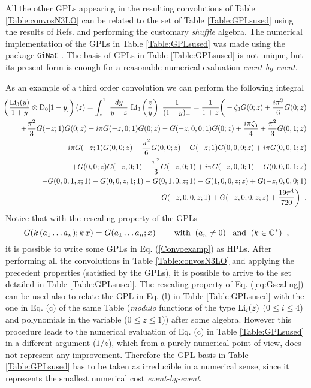 \documentclass[12pt]{article}
\def\beq{\begin{equation}}
\def\eeq{\end{equation}}
\def\beeq{\begin{eqnarray}}
\def\eeeq{\end{eqnarray}}
\def\nn{\nonumber}
\newcommand\f[2]{\frac{#1}{#2}}
\begin{document}
All the other GPLs appearing in the resulting convolutions of Table \ref{Table:convosN3LO} can be related to the set of Table \ref{Table:GPLsused} using the results of Refs. \cite{Frellesvig:2016ske,Maitre:2005uu,Duhr:2011zq} and performing the customary \textit{shuffle} algebra. The numerical implementation of the GPLs in Table \ref{Table:GPLsused} was made using the package \texttt{GiNaC} \cite{Bauer:2000cp}. The basis of GPLs in Table \ref{Table:GPLsused} is not unique, but its present form is enough for a reasonable numerical evaluation \textit{event-by-event}.  

As an example of a third order convolution we can perform the following integral
\beeq\label{Convoexamp}
   &&\!\!\!\!\!\!\!\!\left(\f{{\rm Li}_{3}( y) }{1+y}\otimes  {\rm D}_{0}[1-y]\right)(z) = \int^{1}_{z}~\f{dy}{y+z}~{\rm Li}_{3}\left(\f{z}{y}\right)~\f{1}{(1-y)_{+}}  =\f{1}{1+z}\bigg(-  \zeta_{3} G(0;z)+\frac{i \pi ^3 }{6 }G(0;z)\nn\\
   &&\!\!\!\!\!\!\!\!\!\!+\f{\pi ^2}{3}G(-z;1) G(0;z)-i \pi  G(-z,0;1)G(0;z)-G(-z,0,0;1) G(0;z)+\frac{i\pi  \zeta_{3}}{4}+\frac{\pi ^2 }{3 }G(0,1;z)\nn\\
   &&\!\!\!\!\!\!\!\!\!\! +i \pi  G(-z;1) G(0,0;z)-\frac{\pi ^2 }{6 }G(0,0;z)-G(-z;1) G(0,0,0;z)+i \pi G(0,0,1;z)\nn\\
   &&\!\!\!\!\!\!\!\!\!\! +G(0,0;z)G(-z,0;1)-\frac{\pi ^2 }{3}G(-z,0;1)+i \pi G(-z,0,0;1)-G(0,0,0,1;z)\nn\\
   &&\!\!\!\!\!\!\!\!\!\!-G(0,0,1,z;1)-G(0,0,z,1;1)-G(0,1,0,z;1)-G(1,0,0,z;z)+G(-z,0,0,0;1)\nn\\
   &&\!\!\!\!\!\!\!\!\!\!-G(-z,0,0,z;1)+G(-z,0,0,z;z) +\frac{19 \pi ^4}{720 }\bigg)\;\;.
\eeeq
Notice that with the rescaling property of the GPLs
\beq\label{eq:Gscaling}
G(k\,(a_{1}\ldots a_{n});k\, x) = G(a_{1}\ldots a_{n};x) \;\;\;\;\;\;\;\;{\rm with}\;\; (a_n\neq 0) \;\;\;{\rm and}\;\; (k\in \mathbb{C}^*) \;\;,
\eeq
it is possible to write some GPLs in Eq. (\ref{Convoexamp}) as HPLs. After performing all the convolutions in Table  \ref{Table:convosN3LO} and applying the precedent properties (satisfied by the GPLs), it is possible to arrive to the set detailed in Table \ref{Table:GPLsused}. The rescaling property of Eq. (\ref{eq:Gscaling}) can be used also to relate the GPL in Eq. (l) in Table \ref{Table:GPLsused} with the one in Eq. (c) of the same Table (\textit{modulo} functions of the type ${\rm Li}_{i}(z)$ ($ 0 \leq i \leq 4$) and polynomials in the variable ($ 0 \leq z \leq 1$)) after some algebra. However this procedure leads to the numerical evaluation of Eq. (c) in Table \ref{Table:GPLsused} in a different argument ($1/z$), which from a purely numerical point of view, does not represent any improvement. Therefore the GPL basis in Table \ref{Table:GPLsused} has to be taken as irreducible in a numerical sense, since it represents the smallest numerical cost \textit{event-by-event}.
\end{document}
